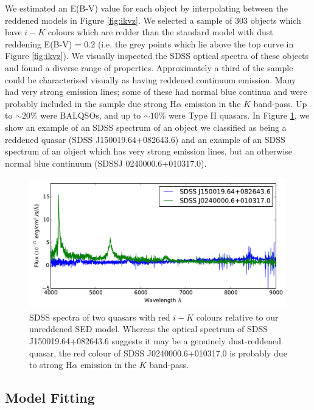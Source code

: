 We estimated an E(B-V) value for each object by interpolating between the reddened models in Figure \ref{fig:ikvz}. We selected a sample of 303 objects which have $i-K$ colours which are redder than the standard model with dust reddening E(B-V) = 0.2 (i.e. the grey points which lie above the top curve in Figure \ref{fig:ikvz}). We visually inspected the SDSS optical spectra of these objects and found a diverse range of properties. Approximately a third of the sample could be characterised visually as having reddened continuum emission. Many had very strong emission lines; some of these had normal blue continua and were probably included in the sample due strong H$\alpha$ emission in the $K$ band-pass. Up to $\sim 20\%$ were BALQSOs, and up to $\sim 10\%$ were Type II quasars. In Figure \ref{fig:spectra}, we show an example of an SDSS spectrum of an object we classified as being a reddened quasar (SDSS J150019.64+082643.6) and an example of an SDSS spectrum of an object which has very strong emission lines, but an otherwise normal blue continuum (SDSSJ 0240000.6+010317.0).  

\begin{figure}
  \centering
  \includegraphics[width=\textwidth]{figures/chapter06/redspectra}
  \caption{SDSS spectra of two quasars with red $i-K$ colours relative to our unreddened SED model. Whereas the optical spectrum of SDSS J150019.64+082643.6 suggests it may be a genuinely dust-reddened quasar, the red colour of SDSS J0240000.6+010317.0 is probably due to strong H$\alpha$ emission in the $K$ band-pass.}
  \label{fig:spectra}
\end{figure}

\subsection{Model Fitting}

